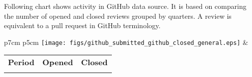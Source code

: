 Following chart shows activity in GitHub data source. It is based on comparing the number of opened and closed reviews grouped by quarters. A review is equivalent to a pull request in GitHub terminology.

\begin{tabular}{p{7cm} p{5cm}}
	\vspace{0pt} 
	\texttt{[image: figs/github\_submitted\_github\_closed\_general.eps]}
	& 
	\vspace{0pt}
	\begin{tabular}{l|r|r|}%
		\bfseries Period & \bfseries Opened & \bfseries Closed %
		\csvreader[head to column names]{data/github_submitted_github_closed_general.csv}{}%
		{\\ & \submitted & \closed}
	\end{tabular}
\end{tabular}
